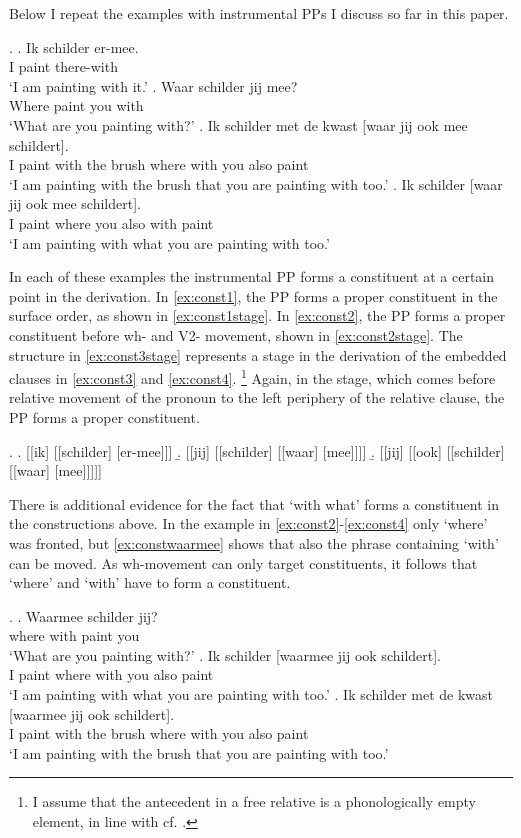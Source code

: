 \documentclass{article}
\begin{document}
Below I repeat the examples with instrumental PPs I discuss so far in this paper.

\ex.
\ag. Ik schilder er-mee.\\
 I paint there-with\\
 `I am painting with it.'\label{ex:const1}
\bg. Waar schilder jij mee?\\
 Where paint you with\\
 `What are you painting with?'\label{ex:const2}
\bg. Ik schilder met de kwast [waar jij ook mee schildert].\\
 I paint with the brush {where with} you also paint\\
 `I am painting with the brush that you are painting with too.'\label{ex:const3}
\bg. Ik schilder [waar jij ook mee schildert].\\
 I paint where you also with paint\\
 `I am painting with what you are painting with too.'\label{ex:const4}

In each of these examples the instrumental PP forms a constituent at a certain point in the derivation. In \ref{ex:const1}, the PP forms a proper constituent in the surface order, as shown in \ref{ex:const1stage}. In \ref{ex:const2}, the PP forms a proper constituent before wh- and V2- movement, shown in \ref{ex:const2stage}.
The structure in \ref{ex:const3stage} represents a stage in the derivation of the embedded clauses in \ref{ex:const3} and \ref{ex:const4}.
\footnote{I assume that the antecedent in a free relative is a phonologically empty element, in line with cf. \cite{bresnan1978a,groos1981,himmelreich2017}.}
Again, in the stage, which comes before relative movement of the pronoun to the left periphery of the relative clause, the PP forms a proper constituent.

\ex.
\a. [[ik] [[schilder] [er-mee]]]\label{ex:const1stage}
\b. [[jij] [[schilder] [[waar] [mee]]]]\label{ex:const2stage}
\b. [[jij] [[ook] [[schilder] [[waar] [mee]]]]]\label{ex:const3stage}

There is additional evidence for the fact that  `with what' forms a constituent in the constructions above. In the example in \ref{ex:const2}-\ref{ex:const4} only  `where' was fronted, but \ref{ex:constwaarmee} shows that also the phrase containing  `with' can be moved. As wh-movement can only target constituents, it follows that  `where' and  `with' have to form a constituent.

\ex.\label{ex:constwaarmee}
\ag. Waarmee schilder jij?\\
 {where with} paint you\\
 `What are you painting with?'
\bg. Ik schilder [waarmee jij ook schildert].\\
 I paint {where with} you also paint\\
 `I am painting with what you are painting with too.'
\bg. Ik schilder met de kwast [waarmee jij ook schildert].\\
 I paint with the brush {where with} you also paint\\
 `I am painting with the brush that you are painting with too.'
\end{document}
